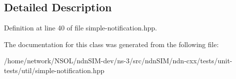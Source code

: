 \subsection{Detailed Description}


Definition at line 40 of file simple-\/notification.\+hpp.



The documentation for this class was generated from the following file\+:\begin{DoxyCompactItemize}
\item 
/home/network/\+N\+S\+O\+L/ndn\+S\+I\+M-\/dev/ns-\/3/src/ndn\+S\+I\+M/ndn-\/cxx/tests/unit-\/tests/util/simple-\/notification.\+hpp\end{DoxyCompactItemize}
